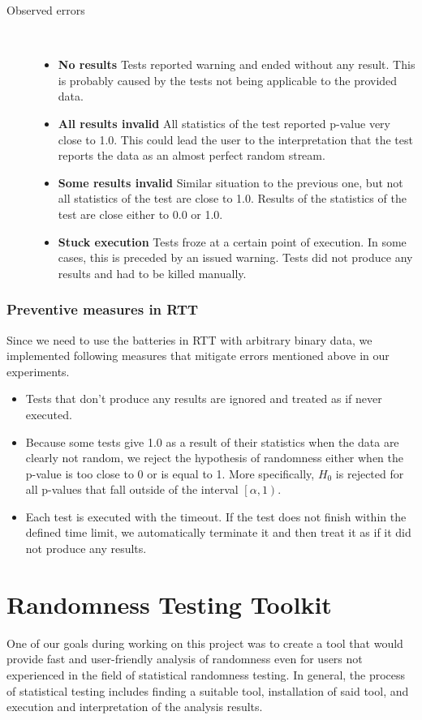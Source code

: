 \documentclass[
	digital,    %
	oneside,    %
	color,
	11pt,
	nocover,
	notable,
	nolof,
	nolot,
]{fithesis3}
\newenvironment{titlemize}[1]
{
	\begin{description}
	\item[#1]\
	\begin{itemize}
}
{
	\end{itemize}
 	\end{description}
}
\theoremstyle{definition}
\theoremstyle{remark}
\begin{document}
\begin{titlemize}{Observed errors}
\item \textbf{No results} Tests reported warning and ended without any result. This is probably caused by the tests not being applicable to the provided data.
\item \textbf{All results invalid}  All statistics of the test reported p-value very close to 1.0. This could lead the user to the interpretation that the test reports the data as an almost perfect random stream.
\item \textbf{Some results invalid} Similar situation to the previous one, but not all statistics of the test are close to 1.0. Results of the statistics of the test are close either to  0.0 or 1.0.
\item \textbf{Stuck execution} Tests froze at a certain point of execution. In some cases, this is preceded by an issued warning. Tests did not produce any results and had to be killed manually.
\end{titlemize}

\subsection{Preventive measures in RTT}
\label{sec:preventive_measures_rtt}
Since we need to use the batteries in RTT with arbitrary binary data, we implemented following measures that mitigate errors mentioned above in our experiments.
\begin{itemize}
\item Tests that don't produce any results are ignored and treated as if never executed.
\item Because some tests give 1.0 as a result of their statistics when the data are clearly not random, we reject the hypothesis of randomness either when the p-value is too close to 0 or is equal to 1. More specifically, $H_0$ is rejected for all p-values that fall outside of the interval $\left[\alpha, 1\right)$.
\item Each test is executed with the timeout. If the test does not finish within the defined time limit, we automatically terminate it and then treat it as if it did not produce any results.
\end{itemize}

\chapter{Randomness Testing Toolkit}
\label{chap:rtt}
One of our goals during working on this project was to create a tool that would provide fast and user-friendly analysis of randomness even for users not experienced in the field of statistical randomness testing. In general, the process of statistical testing includes finding a suitable tool, installation of said tool, and execution and interpretation of the analysis results.
\end{document}
